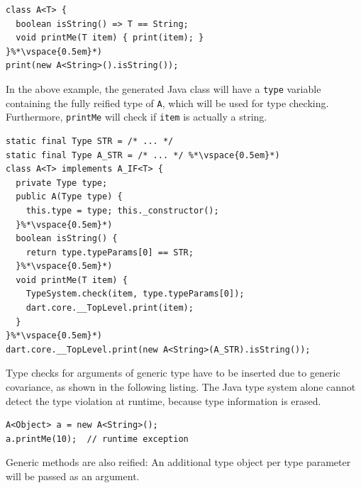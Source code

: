 \documentclass[sigplan]{acmart}
\begin{document}
\begin{mdframed}[outerlinewidth=0.1pt,outerlinecolor=black,skipabove=4pt,
  innerleftmargin=5pt,innerrightmargin=0pt,innertopmargin=0pt,innerbottommargin=0pt]
\begin{lstlisting}
class A<T> {
  boolean isString() => T == String;
  void printMe(T item) { print(item); }
}%*\vspace{0.5em}*)
print(new A<String>().isString());
\end{lstlisting}
\end{mdframed}
In the above example, the generated Java class will have a \texttt{type} variable containing the fully reified type of \texttt{A}, which will be used for type checking. Furthermore, \texttt{printMe} will check if \texttt{item} is actually a string. 
\begin{mdframed}[outerlinewidth=0.1pt,outerlinecolor=black,skipabove=4pt,
  innerleftmargin=5pt,innerrightmargin=0pt,innertopmargin=0pt,innerbottommargin=0pt]
\begin{lstlisting}
static final Type STR = /* ... */
static final Type A_STR = /* ... */ %*\vspace{0.5em}*)
class A<T> implements A_IF<T> {
  private Type type;
  public A(Type type) {
    this.type = type; this._constructor();
  }%*\vspace{0.5em}*)
  boolean isString() {
    return type.typeParams[0] == STR;
  }%*\vspace{0.5em}*)
  void printMe(T item) {
    TypeSystem.check(item, type.typeParams[0]);
    dart.core.__TopLevel.print(item);
  }
}%*\vspace{0.5em}*)
dart.core.__TopLevel.print(new A<String>(A_STR).isString());
\end{lstlisting}
\end{mdframed}
Type checks for arguments of generic type have to be inserted due to generic covariance, as shown in the following listing. The Java type system alone cannot detect the type violation at runtime, because type information is erased.
\begin{mdframed}[outerlinewidth=0.1pt,outerlinecolor=black,skipabove=4pt,
  innerleftmargin=5pt,innerrightmargin=0pt,innertopmargin=0pt,innerbottommargin=0pt]
\begin{lstlisting}
A<Object> a = new A<String>();
a.printMe(10);	// runtime exception
\end{lstlisting}
\end{mdframed}
Generic methods are also reified: An additional type object per type parameter will be passed as an argument.
\end{document}
